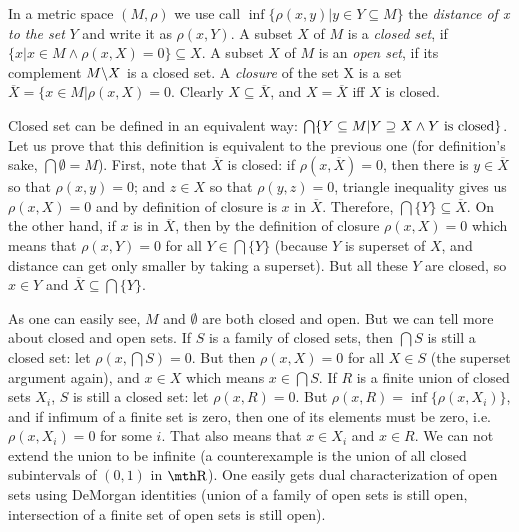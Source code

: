 \bigskip

 In a metric space $(M,\rho)$ we use call $\inf\{
\rho(x,y)|y\in Y\subseteq M\}$ the {\it distance of x to the set} $Y$ and write 
it as $\rho(x,Y)$. A subset $X$ of $M$ is a {\it closed set}, if $\{x|x\in M 
\wedge \rho(x,X) = 0\}\subseteq X$. A subset $X$ of $M$ is an {\it open set}, if 
its complement $M\backslash X$ is a closed set. A {\it closure} of the set X is a 
set $\overline X = \{ x\in M|\rho(x,X)=0$. Clearly $X\subseteq \overline X$, 
and $X = \overline X$ iff $X$ is closed.

\medskip

Closed set can be defined in an equivalent way: $\bigcap\{ Y
\subseteq M| Y\supseteq X \wedge Y\hbox{ is closed}\}$. Let us prove that this
definition is equivalent to the previous one (for definition's sake, $\bigcap 
\emptyset = M$). First, note that $\overline X$ is closed: if $\rho(x,\overline 
X) = 0$, then there is $y\in \overline X$ so that $\rho(x,y) = 0$; and $z \in 
X$ so that $\rho(y,z) = 0$, triangle inequality gives us $\rho(x,X) = 0$
and by definition of closure is $x$ in $\overline X$. Therefore, $\bigcap\{Y\}
\subseteq \overline X$. On the other hand, if $x$ is in $\overline X$, then 
by the definition of closure $\rho(x,X) = 0$ which means that $\rho(x,Y) = 0$ 
for all $Y\in \bigcap\{Y\}$ (because $Y$ is superset of $X$, and distance can 
get only smaller by taking a superset). But all these $Y$ are closed, so $x\in 
Y$ and $\overline X \subseteq \bigcap \{Y\}$.

\medskip

As one can easily see, $M$ and $\emptyset$ are both closed and open. But we 
can tell more about closed and open sets. If $S$ is a family of closed sets,
then $\bigcap S$ is still a closed set: let $\rho(x,\bigcap S)=0$. But then 
$\rho(x,X) = 0$ for all $X\in S$ (the superset argument again), and $x \in 
X$ which means $x\in \bigcap S$. If $R$ is a finite union of closed sets 
$X_i$, $S$ is still a closed set: let $\rho(x,R)=0$. But $\rho(x,R) = 
\inf\{ \rho(x,X_i) \}$, and if infimum of a finite set is zero, then one 
of its elements must be zero, i.e. $\rho(x,X_i) = 0$ for some $i$. That 
also means that $x\in X_i$ and $x\in R$. We can not extend the union to be 
infinite (a counterexample is the union of all closed subintervals of 
$(0,1)$ in $\R$). One easily gets dual characterization of open sets 
using DeMorgan identities (union of a family of open sets is still open, 
intersection of a finite set of open sets is still open).

